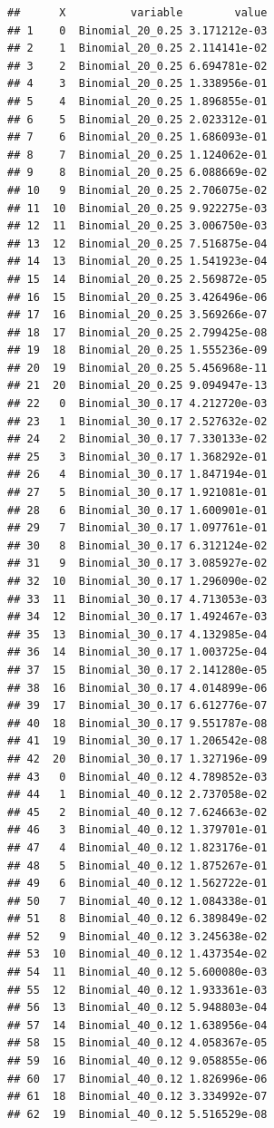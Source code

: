 \documentclass[
]{article}
\begin{document}
\begin{verbatim}
##      X          variable        value
## 1    0  Binomial_20_0.25 3.171212e-03
## 2    1  Binomial_20_0.25 2.114141e-02
## 3    2  Binomial_20_0.25 6.694781e-02
## 4    3  Binomial_20_0.25 1.338956e-01
## 5    4  Binomial_20_0.25 1.896855e-01
## 6    5  Binomial_20_0.25 2.023312e-01
## 7    6  Binomial_20_0.25 1.686093e-01
## 8    7  Binomial_20_0.25 1.124062e-01
## 9    8  Binomial_20_0.25 6.088669e-02
## 10   9  Binomial_20_0.25 2.706075e-02
## 11  10  Binomial_20_0.25 9.922275e-03
## 12  11  Binomial_20_0.25 3.006750e-03
## 13  12  Binomial_20_0.25 7.516875e-04
## 14  13  Binomial_20_0.25 1.541923e-04
## 15  14  Binomial_20_0.25 2.569872e-05
## 16  15  Binomial_20_0.25 3.426496e-06
## 17  16  Binomial_20_0.25 3.569266e-07
## 18  17  Binomial_20_0.25 2.799425e-08
## 19  18  Binomial_20_0.25 1.555236e-09
## 20  19  Binomial_20_0.25 5.456968e-11
## 21  20  Binomial_20_0.25 9.094947e-13
## 22   0  Binomial_30_0.17 4.212720e-03
## 23   1  Binomial_30_0.17 2.527632e-02
## 24   2  Binomial_30_0.17 7.330133e-02
## 25   3  Binomial_30_0.17 1.368292e-01
## 26   4  Binomial_30_0.17 1.847194e-01
## 27   5  Binomial_30_0.17 1.921081e-01
## 28   6  Binomial_30_0.17 1.600901e-01
## 29   7  Binomial_30_0.17 1.097761e-01
## 30   8  Binomial_30_0.17 6.312124e-02
## 31   9  Binomial_30_0.17 3.085927e-02
## 32  10  Binomial_30_0.17 1.296090e-02
## 33  11  Binomial_30_0.17 4.713053e-03
## 34  12  Binomial_30_0.17 1.492467e-03
## 35  13  Binomial_30_0.17 4.132985e-04
## 36  14  Binomial_30_0.17 1.003725e-04
## 37  15  Binomial_30_0.17 2.141280e-05
## 38  16  Binomial_30_0.17 4.014899e-06
## 39  17  Binomial_30_0.17 6.612776e-07
## 40  18  Binomial_30_0.17 9.551787e-08
## 41  19  Binomial_30_0.17 1.206542e-08
## 42  20  Binomial_30_0.17 1.327196e-09
## 43   0  Binomial_40_0.12 4.789852e-03
## 44   1  Binomial_40_0.12 2.737058e-02
## 45   2  Binomial_40_0.12 7.624663e-02
## 46   3  Binomial_40_0.12 1.379701e-01
## 47   4  Binomial_40_0.12 1.823176e-01
## 48   5  Binomial_40_0.12 1.875267e-01
## 49   6  Binomial_40_0.12 1.562722e-01
## 50   7  Binomial_40_0.12 1.084338e-01
## 51   8  Binomial_40_0.12 6.389849e-02
## 52   9  Binomial_40_0.12 3.245638e-02
## 53  10  Binomial_40_0.12 1.437354e-02
## 54  11  Binomial_40_0.12 5.600080e-03
## 55  12  Binomial_40_0.12 1.933361e-03
## 56  13  Binomial_40_0.12 5.948803e-04
## 57  14  Binomial_40_0.12 1.638956e-04
## 58  15  Binomial_40_0.12 4.058367e-05
## 59  16  Binomial_40_0.12 9.058855e-06
## 60  17  Binomial_40_0.12 1.826996e-06
## 61  18  Binomial_40_0.12 3.334992e-07
## 62  19  Binomial_40_0.12 5.516529e-08

\end{verbatim}
\end{document}
